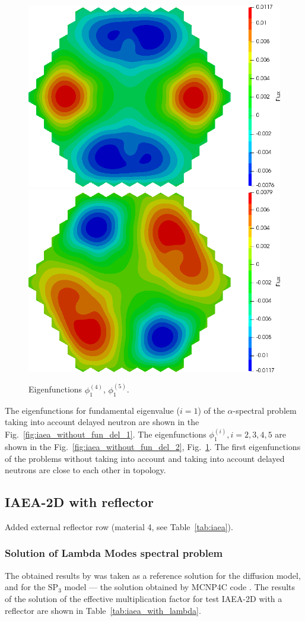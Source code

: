 \documentclass[authoryear]{elsarticle}
\begin{document}
\begin{figure}[htp]
\begin{center}
	\includegraphics[width=0.49\linewidth]{iaea_without/alpha_delayed_sp3_u1_4_without.png}
	\includegraphics[width=0.49\linewidth]{iaea_without/alpha_delayed_sp3_u1_5_without.png}\\
	\caption{Eigenfunctions $\phi_1^{(4)}$, $\phi_1^{(5)}$.}
	\label{fig:iaea_without_fun_del_3}
\end{center}
\end{figure}

The eigenfunctions for fundamental eigenvalue ($i=1$) of the $\alpha$-spectral problem taking into account delayed neutron are shown in the Fig.~\ref{fig:iaea_without_fun_del_1}. 
The eigenfunctions $\phi_1^{(i)}, i=2,3,4,5$ are shown in the Fig.~\ref{fig:iaea_without_fun_del_2}, Fig.~\ref{fig:iaea_without_fun_del_3}.
The first eigenfunctions of the problems without taking into account and taking into account delayed neutrons are close to each other in topology.

\subsection{IAEA-2D with reflector}
Added external reflector row (material 4, see Table~\ref{tab:iaea}). 

\subsubsection{Solution of Lambda Modes spectral problem}
The obtained results by \citep{avvakumov2015} was taken as a reference solution for the diffusion model, and for the $\mathrm{SP_3}$ model ---  the solution obtained by MCNP4C code \citep{ryu2010development}.
The results of the solution of the effective multiplication factor for test IAEA-2D with a reflector are shown in Table~\ref{tab:iaea_with_lambda}. 
\end{document}
